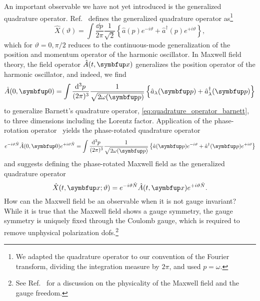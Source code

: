 An important observable we have not yet introduced is the generalized quadrature operator.
Ref.~\cite[p.~79]{Barnett2002} defines the generalized quadrature operator as\footnote{We adapted the quadrature operator to our convention of the Fourier transform, dividing the integration measure by $2\pi$, and used $p=\omega$.}
\begin{equation}
	\hat{X}(\vartheta)
	=
	\int\frac{\dd{p}}{2\pi}
	\frac{1}{\sqrt{2}}
	\left\{
		\hat{a}(p)
		e^{-i\vartheta}
		+
		\hat{a}^\dagger(p)
		e^{+i\vartheta}
	\right\}
	,
	\label{eq:quadrature_operator_barnett}
\end{equation}
which for $\vartheta=0,\pi/2$ reduces to the continuous-mode generalization of the position and momentum operator of the harmonic oscillator.
In Maxwell field theory, the field operator $\hat{A}(t,\vb{x})$ generalizes the position operator of the harmonic oscillator, and indeed, we find
\begin{equation}
	\hat{A}(0,\vb{0})
	=
	\int\frac{\dd[3]{p}}{(2\pi)^3}
	\frac{1}{\sqrt{2\omega(\vb{p})}}
	\left\{
		\hat{a}_\lambda(\vb{p})
		+
		\hat{a}_\lambda^\dagger(\vb{p})
	\right\}
\end{equation}
to generalize Barnett's quadrature operator, \cref{eq:quadrature_operator_barnett}, to three dimensions including the Lorentz factor.
Application of the phase-rotation operator~\cite[p.~38]{Leonhardt2010} yields the phase-rotated quadrature operator
\begin{equation}
	e^{-i\vartheta\hat{N}}
	\hat{A}(0,\vb{0})
	e^{+i\vartheta\hat{N}}
	=
	\int\frac{\dd[3]{p}}{(2\pi)^3}
	\frac{1}{\sqrt{2\omega(\vb{p})}}
	\left\{
		\hat{a}(\vb{p})
		e^{-i\vartheta}
		+
		\hat{a}^\dagger(\vb{p})
		e^{+i\vartheta}
	\right\}
\end{equation}
and suggests defining the phase-rotated Maxwell field as the generalized quadrature operator
\begin{equation}
	\hat{X}(t,\vb{x};\vartheta)
	=
	e^{-i\vartheta\hat{N}}
	\hat{A}(t,\vb{x})
	e^{+i\vartheta\hat{N}}
	.
	\label{eq:quadrature_operator}
\end{equation}
How can the Maxwell field be an observable when it is not gauge invariant?
While it is true that the Maxwell field shows a gauge symmetry, the gauge symmetry is uniquely fixed through the Coulomb gauge, which is required to remove unphysical polarization \gls{dof}s.\footnote{See Ref.~\cite{stackexchange676622} for a discussion on the physicality of the Maxwell field and the gauge freedom.}
